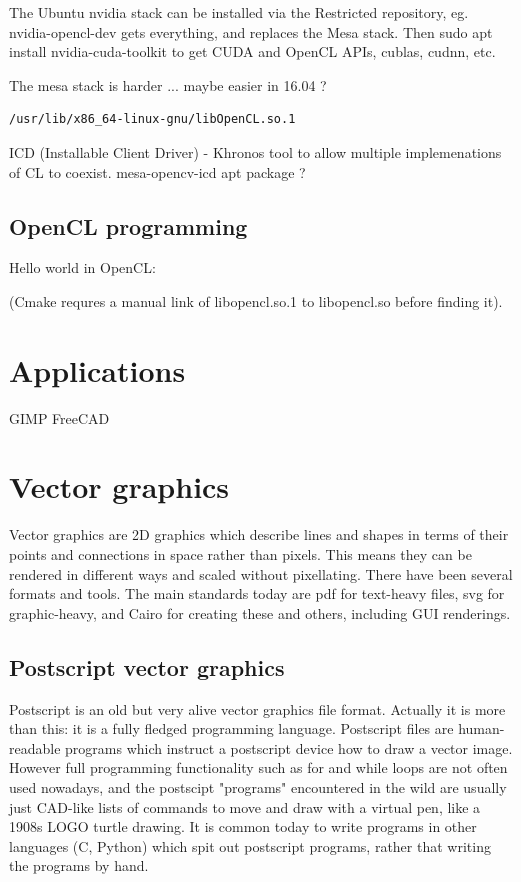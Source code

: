 \documentclass[oneside,english]{scrbook}
\begin{document}
The Ubuntu nvidia stack can be installed via the Restricted repository, eg. nvidia-opencl-dev gets everything, and replaces the Mesa stack.  Then sudo apt install nvidia-cuda-toolkit to get CUDA and OpenCL APIs, cublas, cudnn, etc.

The mesa stack is harder ...  maybe easier in 16.04 ?
\begin{lstlisting}
/usr/lib/x86_64-linux-gnu/libOpenCL.so.1
\end{lstlisting}
ICD (Installable Client Driver) - Khronos tool to allow multiple implemenations of CL to coexist.
mesa-opencv-icd  apt package ?


\section{OpenCL programming}

Hello world in OpenCL:



(Cmake requres a manual link of libopencl.so.1 to libopencl.so before finding it).




\chapter{Applications}

GIMP
FreeCAD





\chapter{Vector graphics}

Vector graphics are 2D graphics which describe lines and shapes in terms of their points and connections in space rather than pixels. This means they can be rendered in different ways and scaled without pixellating.  There have been several formats and tools. The main standards today are pdf for text-heavy files, svg for graphic-heavy, and Cairo for creating these and others, including GUI renderings.

\section{Postscript vector graphics}

Postscript is an old but very alive vector graphics file format. Actually it is more than this: it is a fully fledged programming language.   Postscript files are human-readable programs which instruct a postscript device how to draw a vector image.  However full programming functionality such as for and while loops are not often used nowadays, and the postscipt "programs" encountered in the wild are usually just CAD-like lists of commands to move and draw with a virtual pen, like a 1908s LOGO turtle drawing.  It is common today to write programs in other languages (C, Python) which spit out postscript programs, rather that writing the programs by hand.
\end{document}
